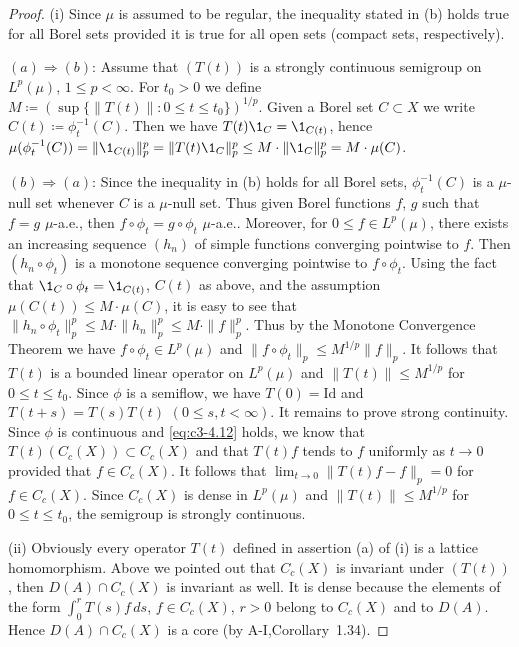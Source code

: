 \begin{proof}
(i) Since $\mu$ is assumed to be regular, the inequality stated
in (b) holds true for all Borel sets provided it is true for all
open sets (compact sets, respectively).

$(a)\Rightarrow(b)$: Assume that $(T(t))$ is a strongly continuous semigroup on
$L^p(\mu)$, $1 \leq p < \infty$. For $t_0 > 0$ we define $M \coloneqq  (\sup\{\|T(t)\| \colon 0 \leq t \leq t_0\})^{1/p}$.
Given a Borel set $C \subset X$ we write $C(t) \coloneqq  \phi_t^{-1}(C)$.
Then we have $T(t)\1_C = \1_{C(t)}$, hence
$\mu(\phi_t^{-1}(C)) = \|\1_{C(t)}\|_p^p = \|T(t)\1_C\|_p^p \leq M \cdot \|\1_C\|_p^p = M \cdot \mu(C)$.

$(b)\Rightarrow(a)$: Since the inequality in (b) holds for all Borel sets,
$\phi_t^{-1}(C)$ is a $\mu$-null set whenever $C$ is a $\mu$-null set. Thus given
Borel functions $f$, $g$ such that $f = g$ $\mu$-a.e., then $f \circ \phi_t = g \circ \phi_t$
$\mu$-a.e.. Moreover, for $0 \leq f \in L^p(\mu)$, there exists an increasing
sequence $(h_n)$ of simple functions converging pointwise to $f$. Then
$(h_n \circ \phi_t)$ is a monotone sequence converging pointwise to $f \circ \phi_t$. Using
the fact that $\1_C \circ \phi_t = \1_{C(t)}$, $C(t)$ as above, and the assumption
$\mu(C(t)) \leq M \cdot \mu(C)$, it is easy to see that $\|h_n \circ \phi_t\|_p^p \leq M \cdot \|h_n\|_p^p \leq M \cdot \|f\|_p^p$.
Thus by the Monotone Convergence Theorem we have $f \circ \phi_t \in L^p(\mu)$ and
$\|f \circ \phi_t\|_p \leq M^{1/p}\|f\|_p$. It follows that $T(t)$ is a bounded linear
operator on $L^p(\mu)$ and $\|T(t)\| \leq M^{1/p}$ for $0 \leq t \leq t_0$. Since $\phi$ is a
semiflow, we have $T(0) = \text{Id}$ and $T(t+s) = T(s)T(t)$ $(0 \leq s,t < \infty)$. It
remains to prove strong continuity. Since $\phi$ is continuous and \eqref{eq:c3-4.12}
holds, we know that $T(t)(C_c(X)) \subset C_c(X)$ and that $T(t)f$ tends to $f$
uniformly as $t \to 0$ provided that $f \in C_c(X)$. It follows that
$\lim_{t \to 0}\|T(t)f - f\|_p = 0$ for $f \in C_c(X)$. Since $C_c(X)$ is dense in
$L^p(\mu)$ and $\|T(t)\| \leq M^{1/p}$ for $0 \leq t \leq t_0$, the semigroup is strongly
continuous.

(ii) Obviously every operator $T(t)$ defined in assertion (a) of (i)
is a lattice homomorphism. Above we pointed out that $C_c(X)$ is
%
%
%
%
invariant under $(T(t))$, then $D(A) \cap C_c(X)$ is invariant as well. It
is dense because the elements of the form $\int_{0}^{r} T(s)f \, ds$, $f \in C_c(X)$,
$r > 0$ belong to $C_c(X)$ and to $D(A)$. Hence $D(A) \cap C_c(X)$ is a core
(by A-I,Corollary~1.34).
\end{proof}

